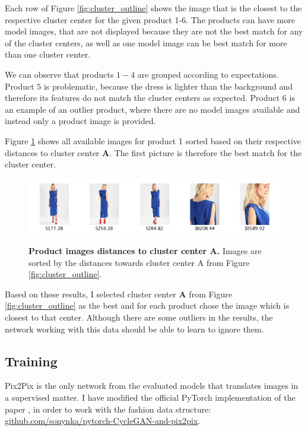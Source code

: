 \documentclass[12pt]{report}
\begin{document}
Each row of Figure \ref{fig:cluster_outline} shows the image that is the closest to the respective cluster center for the given product 1-6. The products can have more model images, that are not displayed because they are not the best match for any of the cluster centers, as well as one model image can be best match for more than one cluster center. 

We can observe that products $1-4$ are grouped according to expectations. Product $5$ is problematic, because the dress is lighter than the background and therefore its features do not match the cluster centers as expected. Product $6$ is an example of an outlier product, where there are no model images available and instead only a product image is provided.

Figure \ref{fig:cluster_outline_distances} shows all available images for product 1 sorted based on their respective distances to cluster center \textbf{A}. The first picture is therefore the best match for the cluster center.

\begin{figure}[h]
\centering
{\includegraphics[width=\linewidth]{04_experiments/clustering/outlines_distances}}
\caption{\label{fig:cluster_outline_distances} \textbf{Product images distances to cluster center A.} Images are sorted by the distances towards cluster center A from Figure \ref{fig:cluster_outline}.}
\end{figure}

Based on these results, I selected cluster center \textbf{A} from Figure \ref{fig:cluster_outline} as the best and for each product chose the image which is closest to that center. Although there are some outliers in the results, the network working with this data should be able to learn to ignore them.

\subsection{Training}
Pix2Pix \cite{isola_image--image_2016} is the only network from the evaluated models that translates images in a supervised matter. I have modified the official PyTorch implementation of the paper \cite{noauthor_junyanz/pytorch-cyclegan-and-pix2pix_nodate}, in order to work with the fashion data structure: \hyperlink{https://github.com/sonynka/pytorch-CycleGAN-and-pix2pix}{github.com/sonynka/pytorch-CycleGAN-and-pix2pix}.
\end{document}

